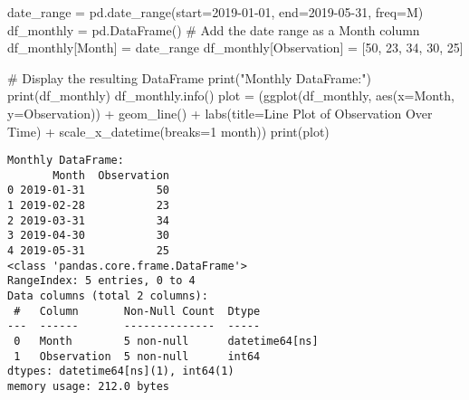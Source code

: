 \documentclass[
  letterpaper,
  DIV=11,
  numbers=noendperiod]{scrreprt}
\newenvironment{Shaded}{\begin{snugshade}}{\end{snugshade}}
\newcommand{\BuiltInTok}[1]{\textcolor[rgb]{0.00,0.23,0.31}{#1}}
\newcommand{\CommentTok}[1]{\textcolor[rgb]{0.37,0.37,0.37}{#1}}
\newcommand{\DecValTok}[1]{\textcolor[rgb]{0.68,0.00,0.00}{#1}}
\newcommand{\NormalTok}[1]{\textcolor[rgb]{0.00,0.23,0.31}{#1}}
\newcommand{\OperatorTok}[1]{\textcolor[rgb]{0.37,0.37,0.37}{#1}}
\newcommand{\StringTok}[1]{\textcolor[rgb]{0.13,0.47,0.30}{#1}}
\begin{document}
\begin{Shaded}
\begin{Highlighting}[]
\NormalTok{date\_range }\OperatorTok{=}\NormalTok{ pd.date\_range(start}\OperatorTok{=}\StringTok{\textquotesingle{}2019{-}01{-}01\textquotesingle{}}\NormalTok{, end}\OperatorTok{=}\StringTok{\textquotesingle{}2019{-}05{-}31\textquotesingle{}}\NormalTok{, freq}\OperatorTok{=}\StringTok{\textquotesingle{}M\textquotesingle{}}\NormalTok{)}
\NormalTok{df\_monthly }\OperatorTok{=}\NormalTok{ pd.DataFrame()}
\CommentTok{\# Add the date range as a \textquotesingle{}Month\textquotesingle{} column}
\NormalTok{df\_monthly[}\StringTok{\textquotesingle{}Month\textquotesingle{}}\NormalTok{] }\OperatorTok{=}\NormalTok{ date\_range}
\NormalTok{df\_monthly[}\StringTok{\textquotesingle{}Observation\textquotesingle{}}\NormalTok{] }\OperatorTok{=}\NormalTok{ [}\DecValTok{50}\NormalTok{, }\DecValTok{23}\NormalTok{, }\DecValTok{34}\NormalTok{, }\DecValTok{30}\NormalTok{, }\DecValTok{25}\NormalTok{]}

\CommentTok{\# Display the resulting DataFrame}
\BuiltInTok{print}\NormalTok{(}\StringTok{"Monthly DataFrame:"}\NormalTok{)}
\BuiltInTok{print}\NormalTok{(df\_monthly)}
\NormalTok{df\_monthly.info()}
\NormalTok{plot }\OperatorTok{=}\NormalTok{ (ggplot(df\_monthly, aes(x}\OperatorTok{=}\StringTok{\textquotesingle{}Month\textquotesingle{}}\NormalTok{, y}\OperatorTok{=}\StringTok{\textquotesingle{}Observation\textquotesingle{}}\NormalTok{)) }\OperatorTok{+}
\NormalTok{        geom\_line() }\OperatorTok{+}
\NormalTok{       labs(title}\OperatorTok{=}\StringTok{\textquotesingle{}Line Plot of Observation Over Time\textquotesingle{}}\NormalTok{) }\OperatorTok{+} 
\NormalTok{       scale\_x\_datetime(breaks}\OperatorTok{=}\StringTok{\textquotesingle{}1 month\textquotesingle{}}\NormalTok{))}
\BuiltInTok{print}\NormalTok{(plot)}
\end{Highlighting}
\end{Shaded}

\begin{verbatim}
Monthly DataFrame:
       Month  Observation
0 2019-01-31           50
1 2019-02-28           23
2 2019-03-31           34
3 2019-04-30           30
4 2019-05-31           25
<class 'pandas.core.frame.DataFrame'>
RangeIndex: 5 entries, 0 to 4
Data columns (total 2 columns):
 #   Column       Non-Null Count  Dtype         
---  ------       --------------  -----         
 0   Month        5 non-null      datetime64[ns]
 1   Observation  5 non-null      int64         
dtypes: datetime64[ns](1), int64(1)
memory usage: 212.0 bytes
\end{verbatim}
\end{document}
